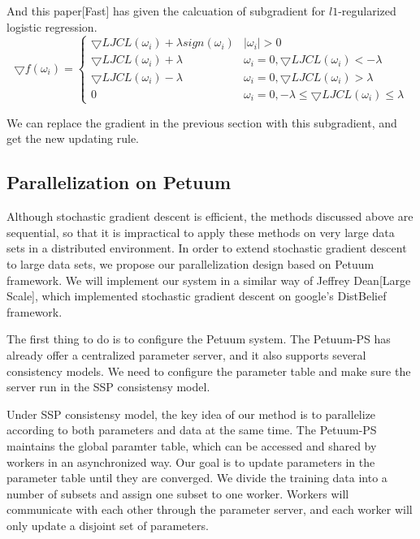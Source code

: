 \documentclass{article} %
\begin{document}
And this paper[Fast] has given the calcuation of subgradient for $l1$-regularized logistic regression.
\begin{equation}
\bigtriangledown f(\omega_i) = \left\{\begin{matrix}
\bigtriangledown LJCL(\omega_i) + \lambda sign(\omega_i) & |\omega_i| > 0\\ 
\bigtriangledown LJCL(\omega_i) + \lambda & \omega_i=0,\bigtriangledown LJCL(\omega_i)<-\lambda\\ 
\bigtriangledown LJCL(\omega_i) - \lambda & \omega_i=0,\bigtriangledown LJCL(\omega_i)>\lambda\\ 
0 & \omega_i=0, -\lambda \le \bigtriangledown LJCL(\omega_i) \le \lambda
\end{matrix}\right.
\end{equation}

We can replace the gradient in the previous section with this subgradient, and get the new updating rule.

\subsection{Parallelization on Petuum}
Although stochastic gradient descent is efficient, the methods discussed above are sequential, so that it is impractical to apply these methods on very large data sets in a distributed environment. In order to extend stochastic gradient descent to large data sets, we propose our parallelization design based on Petuum framework. We will implement our system in a similar way of Jeffrey Dean[Large Scale], which implemented stochastic gradient descent on google's DistBelief framework.

The first thing to do is to configure the Petuum system. The Petuum-PS has already offer a centralized parameter server, and it also supports several consistency models. We need to configure the parameter table and make sure the server run in the SSP consistensy model.

Under SSP consistensy model, the key idea of our method is to parallelize according to both parameters and data at the same time. The Petuum-PS maintains the global paramter table, which can be accessed and shared by workers in an asynchronized way. Our goal is to update parameters in the parameter table until they are converged. We divide the training data into a number of subsets and assign one subset to one worker. Workers will communicate with each other through the parameter server, and each worker will only update a disjoint set of parameters.
\end{document}
